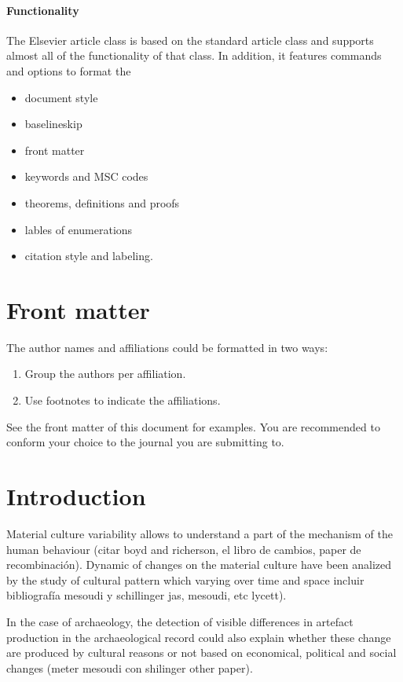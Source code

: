 \documentclass[review]{elsarticle}
\begin{document}
\paragraph{Functionality} The Elsevier article class is based on the standard article class and supports almost all of the functionality of that class. In addition, it features commands and options to format the
\begin{itemize}
\item document style
\item baselineskip
\item front matter
\item keywords and MSC codes
\item theorems, definitions and proofs
\item lables of enumerations
\item citation style and labeling.
\end{itemize}

\section{Front matter}

The author names and affiliations could be formatted in two ways:
\begin{enumerate}[(1)]
\item Group the authors per affiliation.
\item Use footnotes to indicate the affiliations.
\end{enumerate}
See the front matter of this document for examples. You are recommended to conform your choice to the journal you are submitting to.



\section{Introduction}


Material culture variability allows to understand a part of the mechanism of the human behaviour (citar boyd and richerson, el libro de cambios, paper de recombinación). Dynamic of changes on the material culture have been analized by the study of cultural pattern which varying over time and space \citep{eerkens_jelmer_cultural_2007, lycett_cultural_2015} incluir bibliografía mesoudi y schillinger jas, mesoudi, etc lycett).

In the case of archaeology, the detection of visible differences in artefact production in the archaeological record could also explain whether these change are produced by cultural reasons or not based on economical, political and social changes  (meter mesoudi con shilinger other paper).
\end{document}
